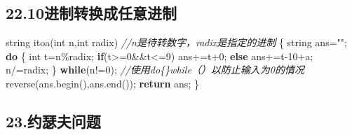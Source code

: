 \documentclass[
]{article}
\newenvironment{Shaded}{}{}
\newcommand{\CharTok}[1]{\textcolor[rgb]{0.25,0.44,0.63}{#1}}
\newcommand{\CommentTok}[1]{\textcolor[rgb]{0.38,0.63,0.69}{\textit{#1}}}
\newcommand{\ControlFlowTok}[1]{\textcolor[rgb]{0.00,0.44,0.13}{\textbf{#1}}}
\newcommand{\DataTypeTok}[1]{\textcolor[rgb]{0.56,0.13,0.00}{#1}}
\newcommand{\DecValTok}[1]{\textcolor[rgb]{0.25,0.63,0.44}{#1}}
\newcommand{\NormalTok}[1]{#1}
\newcommand{\OperatorTok}[1]{\textcolor[rgb]{0.40,0.40,0.40}{#1}}
\newcommand{\StringTok}[1]{\textcolor[rgb]{0.25,0.44,0.63}{#1}}
\begin{document}
\hypertarget{2210ux8fdbux5236ux8f6cux6362ux6210ux4efbux610fux8fdbux5236}{%
\subsection{22.10进制转换成任意进制}\label{2210ux8fdbux5236ux8f6cux6362ux6210ux4efbux610fux8fdbux5236}}

\begin{Shaded}
\begin{Highlighting}[]
\NormalTok{string itoa}\OperatorTok{(}\DataTypeTok{int}\NormalTok{ n}\OperatorTok{,}\DataTypeTok{int}\NormalTok{ radix}\OperatorTok{)}    \CommentTok{//n是待转数字，radix是指定的进制}
\OperatorTok{\{}
\NormalTok{    string ans}\OperatorTok{=}\StringTok{""}\OperatorTok{;}
    \ControlFlowTok{do}
    \OperatorTok{\{}
        \DataTypeTok{int}\NormalTok{ t}\OperatorTok{=}\NormalTok{n}\OperatorTok{\%}\NormalTok{radix}\OperatorTok{;}
        \ControlFlowTok{if}\OperatorTok{(}\NormalTok{t}\OperatorTok{\textgreater{}=}\DecValTok{0}\OperatorTok{\&\&}\NormalTok{t}\OperatorTok{\textless{}=}\DecValTok{9}\OperatorTok{)}\NormalTok{	ans}\OperatorTok{+=}\NormalTok{t}\OperatorTok{+}\CharTok{\textquotesingle{}0\textquotesingle{}}\OperatorTok{;}
        \ControlFlowTok{else}\NormalTok{ ans}\OperatorTok{+=}\NormalTok{t}\OperatorTok{{-}}\DecValTok{10}\OperatorTok{+}\CharTok{\textquotesingle{}a\textquotesingle{}}\OperatorTok{;}
\NormalTok{        n}\OperatorTok{/=}\NormalTok{radix}\OperatorTok{;}
    \OperatorTok{\}}
    \ControlFlowTok{while}\OperatorTok{(}\NormalTok{n}\OperatorTok{!=}\DecValTok{0}\OperatorTok{);}	\CommentTok{//使用do\{\}while（）以防止输入为0的情况}
\NormalTok{    reverse}\OperatorTok{(}\NormalTok{ans}\OperatorTok{.}\NormalTok{begin}\OperatorTok{(),}\NormalTok{ans}\OperatorTok{.}\NormalTok{end}\OperatorTok{());}
    \ControlFlowTok{return}\NormalTok{ ans}\OperatorTok{;}
\OperatorTok{\}}
\end{Highlighting}
\end{Shaded}

\hypertarget{23ux7ea6ux745fux592bux95eeux9898}{%
\subsection{23.约瑟夫问题}\label{23ux7ea6ux745fux592bux95eeux9898}}
\end{document}
